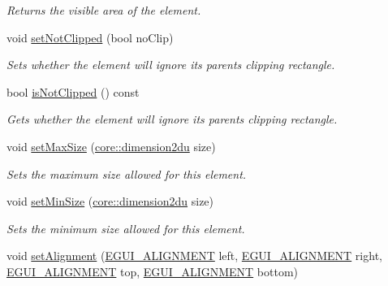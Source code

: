 \begin{DoxyCompactItemize}
\begin{DoxyCompactList}\small\item\em Returns the visible area of the element. \end{DoxyCompactList}\item 
void \hyperlink{classirr_1_1gui_1_1IGUIElement_a814d322989acafa74c895e5c13908b86}{set\+Not\+Clipped} (bool no\+Clip)
\begin{DoxyCompactList}\small\item\em Sets whether the element will ignore its parent\textquotesingle{}s clipping rectangle. \end{DoxyCompactList}\item 
bool \hyperlink{classirr_1_1gui_1_1IGUIElement_a940fcf886f9ae1e4bc719e19057018a2}{is\+Not\+Clipped} () const
\begin{DoxyCompactList}\small\item\em Gets whether the element will ignore its parent\textquotesingle{}s clipping rectangle. \end{DoxyCompactList}\item 
void \hyperlink{classirr_1_1gui_1_1IGUIElement_ae80ad7253fb9fb2ebbeda2a8148fff3e}{set\+Max\+Size} (\hyperlink{namespaceirr_1_1core_a13e5bd7e47b2014eefc870ede11bbbbc}{core\+::dimension2du} size)
\begin{DoxyCompactList}\small\item\em Sets the maximum size allowed for this element. \end{DoxyCompactList}\item 
\mbox{\label{classirr_1_1gui_1_1IGUIElement_ae1ddcdd58af93fea900bd6295d4d8e61}} 
void \hyperlink{classirr_1_1gui_1_1IGUIElement_ae1ddcdd58af93fea900bd6295d4d8e61}{set\+Min\+Size} (\hyperlink{namespaceirr_1_1core_a13e5bd7e47b2014eefc870ede11bbbbc}{core\+::dimension2du} size)
\begin{DoxyCompactList}\small\item\em Sets the minimum size allowed for this element. \end{DoxyCompactList}\item 
\mbox{\label{classirr_1_1gui_1_1IGUIElement_a1eb3d7ec13ebbf8c73859810088f666b}} 
void \hyperlink{classirr_1_1gui_1_1IGUIElement_a1eb3d7ec13ebbf8c73859810088f666b}{set\+Alignment} (\hyperlink{namespaceirr_1_1gui_a19eb5fb40e67f108cb16aba922ddaa2d}{E\+G\+U\+I\+\_\+\+A\+L\+I\+G\+N\+M\+E\+NT} left, \hyperlink{namespaceirr_1_1gui_a19eb5fb40e67f108cb16aba922ddaa2d}{E\+G\+U\+I\+\_\+\+A\+L\+I\+G\+N\+M\+E\+NT} right, \hyperlink{namespaceirr_1_1gui_a19eb5fb40e67f108cb16aba922ddaa2d}{E\+G\+U\+I\+\_\+\+A\+L\+I\+G\+N\+M\+E\+NT} top, \hyperlink{namespaceirr_1_1gui_a19eb5fb40e67f108cb16aba922ddaa2d}{E\+G\+U\+I\+\_\+\+A\+L\+I\+G\+N\+M\+E\+NT} bottom)

\end{DoxyCompactItemize}
